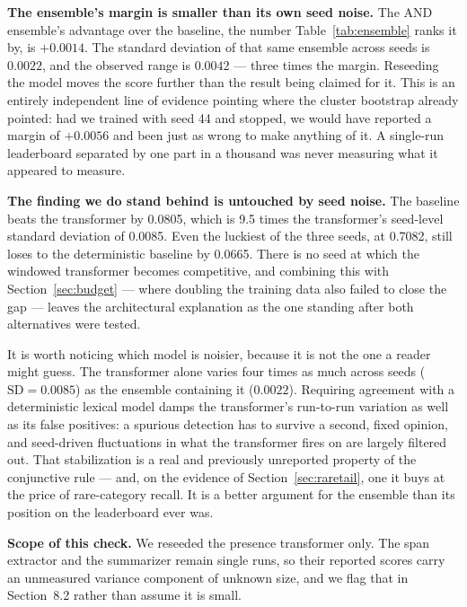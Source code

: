 \textbf{The ensemble's margin is smaller than its own seed noise.} The AND ensemble's advantage over the baseline, the number Table~\ref{tab:ensemble} ranks it by, is $+0.0014$. The standard deviation of that same ensemble across seeds is $0.0022$, and the observed range is $0.0042$ --- three times the margin. Reseeding the model moves the score further than the result being claimed for it. This is an entirely independent line of evidence pointing where the cluster bootstrap already pointed: had we trained with seed 44 and stopped, we would have reported a margin of $+0.0056$ and been just as wrong to make anything of it. A single-run leaderboard separated by one part in a thousand was never measuring what it appeared to measure.

\textbf{The finding we do stand behind is untouched by seed noise.} The baseline beats the transformer by 0.0805, which is 9.5 times the transformer's seed-level standard deviation of 0.0085. Even the luckiest of the three seeds, at 0.7082, still loses to the deterministic baseline by 0.0665. There is no seed at which the windowed transformer becomes competitive, and combining this with Section~\ref{sec:budget} --- where doubling the training data also failed to close the gap --- leaves the architectural explanation as the one standing after both alternatives were tested.

It is worth noticing which model is noisier, because it is not the one a reader might guess. The transformer alone varies four times as much across seeds ($\mathrm{SD} = 0.0085$) as the ensemble containing it ($0.0022$). Requiring agreement with a deterministic lexical model damps the transformer's run-to-run variation as well as its false positives: a spurious detection has to survive a second, fixed opinion, and seed-driven fluctuations in what the transformer fires on are largely filtered out. That stabilization is a real and previously unreported property of the conjunctive rule --- and, on the evidence of Section~\ref{sec:raretail}, one it buys at the price of rare-category recall. It is a better argument for the ensemble than its position on the leaderboard ever was.

\textbf{Scope of this check.} We reseeded the presence transformer only. The span extractor and the summarizer remain single runs, so their reported scores carry an unmeasured variance component of unknown size, and we flag that in Section~8.2 rather than assume it is small.


